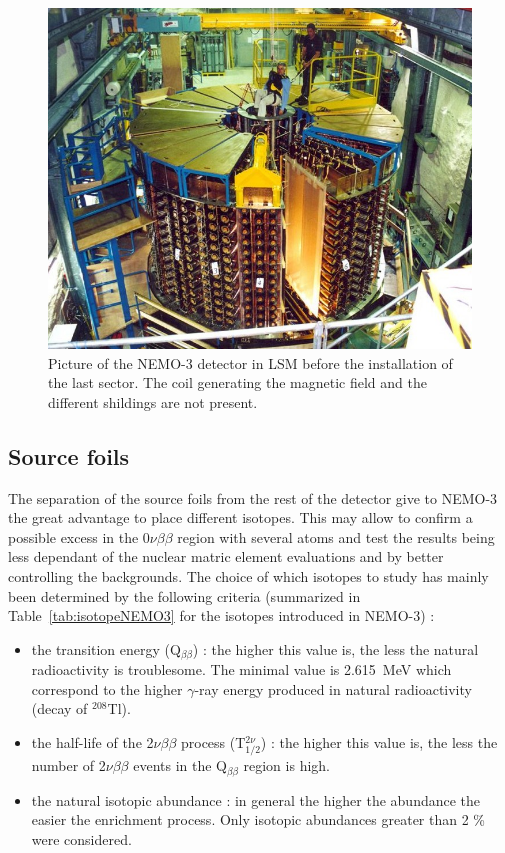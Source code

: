 \documentclass[main.tex]{subfiles}
\begin{document}
\begin{figure}[h!]
\begin{center}
\includegraphics[scale=0.40]{pictures/Chap3/photoNEMO3.jpg}
\caption{Picture of the NEMO-3 detector in LSM before the installation of the last sector. The coil generating the magnetic field and the different shildings are not present.}
\label{NEMO3Photo}
\end{center}
\end{figure}


\FloatBarrier


\subsection{Source foils}

\NI The separation of the source foils from the rest of the detector give to NEMO-3 the great advantage to place different isotopes. This may allow to confirm a possible excess in the 0$\nu\beta\beta$ region with several atoms and test the results being less dependant of the nuclear matric element evaluations and by better controlling the backgrounds. The choice of which isotopes to study has mainly been determined by the following criteria (summarized in Table~\ref{tab:isotopeNEMO3} for the isotopes introduced in NEMO-3) : 


\begin{itemize}
\item the transition energy (Q$_{\beta\beta}$) : the higher this value is, the less the natural radioactivity is troublesome. The minimal value is 2.615~MeV which correspond to the higher $\gamma$-ray energy produced in natural radioactivity (decay of $^{\text{208}}$Tl).


\item the half-life of the 2$\nu\beta\beta$ process (T$_{\text{1/2}}^{\text{2}\nu}$) : the higher this value is, the less the number of 2$\nu\beta\beta$ events in the Q$_{\beta\beta}$ region is high.  


\item the natural isotopic abundance : in general the higher the abundance the easier the enrichment process. Only isotopic abundances greater than 2 \% were considered. 
\end{itemize}
\end{document}
